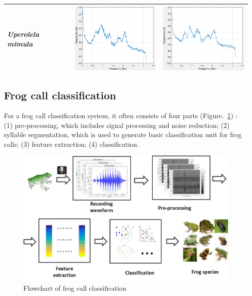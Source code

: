 \begin{table}[htb!]
{\begin{tabular}{lll}
\textit{Uperolela mimula}            &   \begin{minipage}{.3\textwidth} \includegraphics[width=45mm, height=35mm]{image/Ch1/8_signal.png}  \end{minipage}                              &                                             \begin{minipage}{.3\textwidth} \includegraphics[width=45mm, height=35mm]{image/Ch1/8_noise.png}  \end{minipage} \\ \hline\hline
\end{tabular}
}
\end{table}

\subsection{Frog call classification}

For a frog call classification system, it often consists of four parts (Figure.~\ref{fig:Ch1_flowchart}) : (1) pre-processing, which includes signal processing and noise reduction; (2) syllable segmentation, which is used to generate basic classification unit for frog calls; (3) feature extraction; (4) classification.  



\begin{figure}[htb!]
\centering
\includegraphics[width=\textwidth]{image/Ch1/flowchart.jpg}
\caption[Flowchart of frog call classification]{Flowchart of frog call classification}
\label{fig:Ch1_flowchart}
\end{figure}


